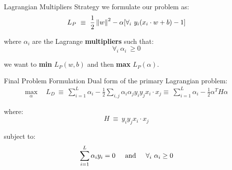 \begin{frame}[fragile]{Lagrangian Multipliers Strategy}
  we formulate our problem as:
  \newline
  \begin{equation*}
    \begin{split}
      L_P\ \equiv\ \frac{1}{2} \left\lVert w\right\rVert^2 - \alpha [\forall_i\  y_i (x_i \cdot w + b) - 1]
    \end{split}
  \end{equation*}

  where $\alpha_i$ are the Lagrange \textbf{multipliers} such that:
  \begin{equation*}
    \forall_i\ \alpha_i\ \geq 0 
  \end{equation*}

  we want to \textbf{min} $L_P(w,b)$ and then \textbf{max} $L_P(\alpha)$.
\end{frame}


\begin{frame}[fragile]{Final Problem Formulation}
  Dual form of the primary Lagrangian problem:
  \newline
  \begin{equation*}
    \begin{split}
      \max_{\alpha}\ &\ L_D\ \equiv\ \sum_{i=1}^{L} \alpha_i - \frac{1}{2} \sum_{i,j} \alpha_i \alpha_j y_i y_j x_i \cdot x_j
      \equiv\ \sum_{i=1}^{L} \alpha_i - \frac{1}{2} \alpha^T H \alpha
    \end{split}
  \end{equation*}

  where:
  \newline
  \begin{equation*}
    H\ \equiv\ y_i y_j x_i \cdot x_j
  \end{equation*}

  subject to:
  \newline
  \begin{equation*}
    \sum_{i=1}^{L} \alpha_i y_i = 0 \hspace{.5cm} \text{and} \hspace{.5cm} \forall_i\ \alpha_i \geq 0 
  \end{equation*}
\end{frame}
